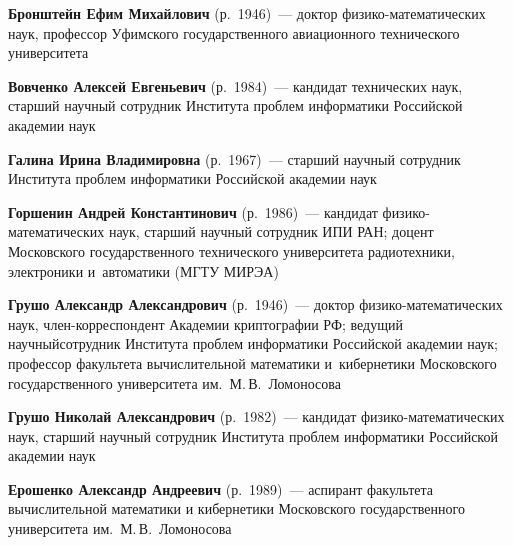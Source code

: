 \begin{multicols}{2}

\noindent
\textbf{Бронштейн  Ефим  Михайлович}  (р.\ 1946)~---
доктор фи\-зи\-ко-ма\-те\-ма\-ти\-че\-ских наук,  профессор
Уфимского  государственного авиационного технического университета


\vspace*{2pt}

\noindent
\textbf{Вовченко Алексей Евгеньевич} (р.\ 1984)~---
кандидат технических наук, старший научный сотрудник Института
проблем информатики Российской академии наук

\vspace*{2pt}


\noindent
\textbf{Галина Ирина Владимировна} (р.\ 1967)~---
старший научный сотрудник Института проблем информатики Российской академии наук

\vspace*{2pt}

\noindent
\textbf{Горшенин Андрей Константинович} (р.\ 1986)~---
 кандидат фи\-зи\-ко-ма\-те\-ма\-ти\-че\-ских наук,
 старший научный сотрудник ИПИ РАН; доцент Московского государственного
 технического университета радиотехники, электроники и~автоматики (МГТУ МИРЭА)

\vspace*{2pt}

 \noindent
\textbf{Грушо Александр Александрович} (р.\ 1946)~---
доктор фи\-зи\-ко-ма\-те\-ма\-ти\-че\-ских наук, член-кор\-рес\-пон\-дент
Академии криптографии РФ; ведущий научный\linebreak сотрудник Института
проблем информатики Российской академии наук; профессор факультета
вычисли\-тель\-ной математики и~кибернетики Московского государственного
университета им.~М.\,В.~Ломоносова

\vspace*{2pt}

\noindent
\textbf{Грушо Николай Александрович} (р.\ 1982)~---
кандидат фи\-зи\-ко-ма\-те\-ма\-ти\-че\-ских
наук, старший научный сотрудник Института проблем информатики
Российской академии наук

\vspace*{2pt}


\noindent
\textbf{Ерошенко Александр Андреевич} (р.\ 1989)~---
аспирант факультета вычислительной
математики и кибернетики Московского государственного
университета им.~М.\,В.~Ломоносова

\vspace*{2pt}


\end{multicols}
